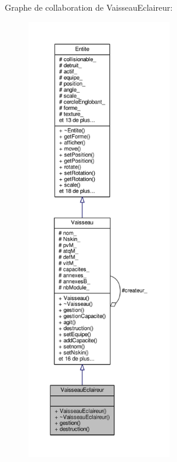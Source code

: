 Graphe de collaboration de Vaisseau\+Eclaireur\+:\nopagebreak
\begin{figure}[H]
\begin{center}
\leavevmode
\includegraphics[height=550pt]{class_vaisseau_eclaireur__coll__graph}
\end{center}
\end{figure}
